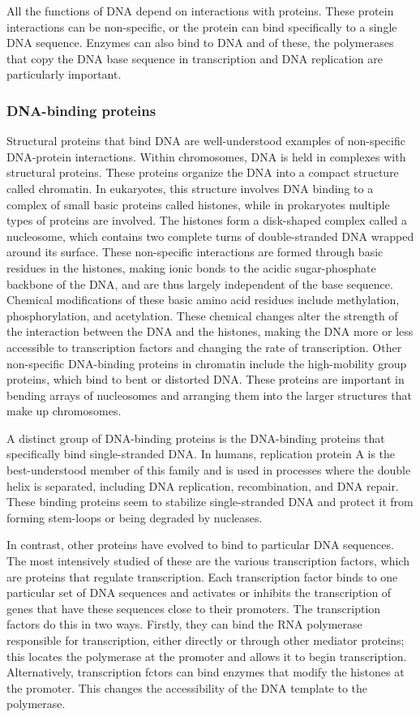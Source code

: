 All the functions of DNA depend on interactions with proteins. These protein interactions can be non-specific, or the protein can bind specifically to a single DNA sequence. Enzymes can also bind to DNA and of these, the polymerases that copy the DNA base sequence in transcription and DNA replication are particularly important.

\hypertarget{dna-binding-proteins}{%
\subsubsection{DNA-binding proteins}\label{dna-binding-proteins}}

Structural proteins that bind DNA are well-understood examples of non-specific DNA-protein interactions. Within chromosomes, DNA is held in complexes with structural proteins. These proteins organize the DNA into a compact structure called chromatin. In eukaryotes, this structure involves DNA binding to a complex of small basic proteins called histones, while in prokaryotes multiple types of proteins are involved. The histones form a disk-shaped complex called a nucleosome, which contains two complete turns of double-stranded DNA wrapped around its surface. These non-specific interactions are formed through basic residues in the histones, making ionic bonds to the acidic sugar-phosphate backbone of the DNA, and are thus largely independent of the base sequence. Chemical modifications of these basic amino acid residues include methylation, phosphorylation, and acetylation. These chemical changes alter the strength of the interaction between the DNA and the histones, making the DNA more or less accessible to transcription factors and changing the rate of transcription. Other non-specific DNA-binding proteins in chromatin include the high-mobility group proteins, which bind to bent or distorted DNA. These proteins are important in bending arrays of nucleosomes and arranging them into the larger structures that make up chromosomes.

A distinct group of DNA-binding proteins is the DNA-binding proteins that specifically bind single-stranded DNA. In humans, replication protein A is the best-understood member of this family and is used in processes where the double helix is separated, including DNA replication, recombination, and DNA repair. These binding proteins seem to stabilize single-stranded DNA and protect it from forming stem-loops or being degraded by nucleases.

In contrast, other proteins have evolved to bind to particular DNA sequences. The most intensively studied of these are the various transcription factors, which are proteins that regulate transcription. Each transcription factor binds to one particular set of DNA sequences and activates or inhibits the transcription of genes that have these sequences close to their promoters. The transcription factors do this in two ways. Firstly, they can bind the RNA polymerase responsible for transcription, either directly or through other mediator proteins; this locates the polymerase at the promoter and allows it to begin transcription. Alternatively, transcription fctors can bind enzymes that modify the histones at the promoter. This changes the accessibility of the DNA template to the polymerase.

